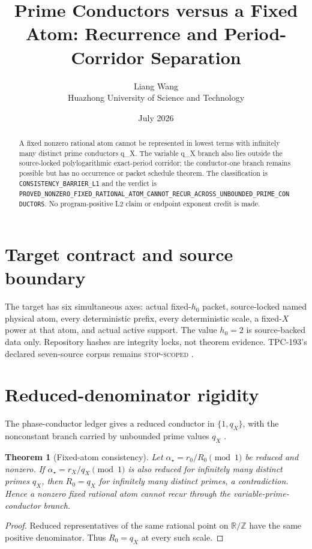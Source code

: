 \documentclass[11pt]{article}
\title{\textbf{Prime Conductors versus a Fixed Atom: Recurrence and Period-Corridor Separation}}
\author{Liang Wang\\Huazhong University of Science and Technology}
\date{July 2026}
\newtheorem{theorem}{Theorem}
\begin{document}
\maketitle
\begin{abstract}
A fixed nonzero rational atom cannot be represented in lowest terms with infinitely many distinct prime conductors q\_\allowbreak{}X.  The variable q\_\allowbreak{}X branch also lies outside the source-locked polylogarithmic exact-period corridor; the conductor-one branch remains possible but has no occurrence or packet schedule theorem.
The classification is \texttt{CONSISTENCY\_\allowbreak{}BARRIER\_\allowbreak{}L1} and the
verdict is \texttt{PROVED\_\allowbreak{}NONZERO\_\allowbreak{}FIXED\_\allowbreak{}RATIONAL\_\allowbreak{}ATOM\_\allowbreak{}CANNOT\_\allowbreak{}RECUR\_\allowbreak{}ACROSS\_\allowbreak{}UNBOUNDED\_\allowbreak{}PRIME\_\allowbreak{}CONDUCTORS}.  No program-positive L2
claim or endpoint exponent credit is made.
\end{abstract}

\section{Target contract and source boundary}
The target has six simultaneous axes: actual fixed-\(h_0\) packet,
source-locked named physical atom, every deterministic prefix, every
deterministic scale, a fixed-\(X\) power at that atom, and actual active
support.  The value \(h_0=2\) is source-backed data only.  Repository hashes
are integrity locks, not theorem evidence.  TPC-193's declared seven-source
corpus remains \textsc{stop-scoped} \citep{WangTPC193}.


\section{Reduced-denominator rigidity}
The phase-conductor ledger gives a reduced conductor in
\(\{1,q_X\}\), with the nonconstant branch carried by unbounded prime
values \(q_X\) \citep{WangTPC93,WangTPC94}.

\begin{theorem}[Fixed-atom consistency]
Let \(\alpha_\star=r_0/R_0\pmod1\) be reduced and nonzero.  If
\(\alpha_\star=r_X/q_X\pmod1\) is also reduced for infinitely many
distinct primes \(q_X\), then \(R_0=q_X\) for infinitely many distinct
primes, a contradiction.  Hence a nonzero fixed rational atom cannot recur
through the variable-prime-conductor branch.
\end{theorem}
\begin{proof}
Reduced representatives of the same rational point on
\(\mathbb R/\mathbb Z\) have the same positive denominator.  Thus
\(R_0=q_X\) at every such scale.
\end{proof}
\end{document}
